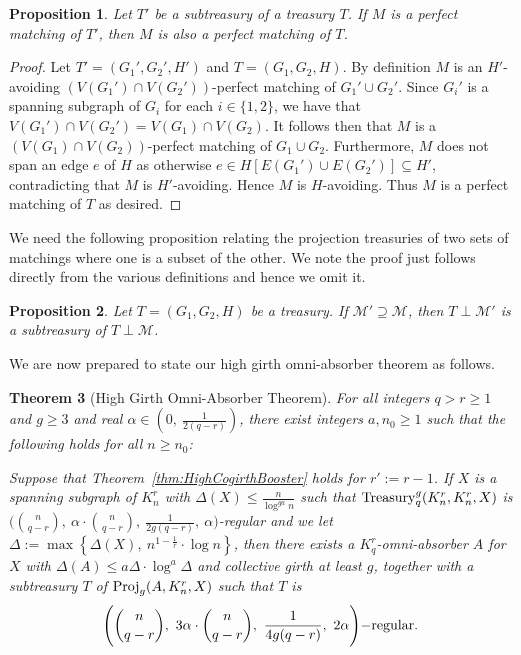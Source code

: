 \documentclass[11pt]{article}
\newcounter{i}
\theoremstyle{plain}
\newtheorem{thm}{Theorem}[section]
\newtheorem{proposition}[thm]{Proposition}
\theoremstyle{plain} %
\theoremstyle{definition}
\begin{document}
\begin{proposition}\label{prop:SubTreasury}
Let $T'$ be a subtreasury of a treasury $T$. If $M$ is a perfect matching of $T'$, then $M$ is also a perfect matching of $T$.    
\end{proposition}
\begin{proof}
Let $T'=(G_1',G_2',H')$ and $T=(G_1,G_2,H)$. By definition $M$ is an $H'$-avoiding $(V(G_1')\cap V(G_2'))$-perfect matching of $G_1'\cup G_2'$. Since $G_i'$ is a spanning subgraph of $G_i$ for each $i\in \{1,2\}$, we have that $V(G_1')\cap V(G_2') = V(G_1)\cap V(G_2)$.  It follows then that $M$ is a $(V(G_1)\cap V(G_2))$-perfect matching of $G_1\cup G_2$. Furthermore, $M$ does not span an edge $e$ of $H$ as otherwise $e\in H[E(G_1')\cup E(G_2')] \subseteq H'$, contradicting that $M$ is $H'$-avoiding. Hence $M$ is $H$-avoiding. Thus $M$ is a perfect matching of $T$ as desired.
\end{proof}

We need the following proposition relating the projection treasuries 
of two sets of matchings where one is a subset of the other. We note the proof just follows directly from the various definitions and hence we omit it.

\begin{proposition}\label{prop:SubProjTreasury}
Let $T=(G_1,G_2,H)$ be a treasury. If $\mathcal{M}'\supseteq \mathcal{M}$, then $T\perp \mathcal{M}'$ is a subtreasury of $T\perp \mathcal{M}$.
\end{proposition} 

We are now prepared to state our high girth omni-absorber theorem as follows.

\begin{thm}[High Girth Omni-Absorber Theorem]\label{thm:HighGirthAbsorber}
For all integers $q>r\ge 1$ and $g\ge 3$ and real $\alpha \in \left(0,~\frac{1}{2(q-r)}\right)$, there exist integers $a,n_0\ge 1$ such that the following holds for all $n\ge n_0$: 

Suppose that Theorem~\ref{thm:HighCogirthBooster} holds for $r':=r-1$. If $X$ is a spanning subgraph of $K_n^r$ with $\Delta(X) \le \frac{n}{\log^{ga} n}$ such that ${\rm Treasury}^g_q(K_n^r,K_n^r,X)$ is $\bigg(\binom{n}{q-r},~\alpha\cdot \binom{n}{q-r},~\frac{1}{2g(q-r)},~\alpha\bigg)$-regular and we let $\Delta:= \max\left\{ \Delta(X),~n^{1-\frac{1}{r}}\cdot \log n\right\}$, then there exists a $K_q^r$-omni-absorber $A$ for $X$ with $\Delta(A)\le a\Delta\cdot \log^{a} \Delta$ and collective girth at least $g$, together with a subtreasury $T$ of ${\rm Proj}_g(A, K_n^r, X)$ such that $T$ is 
$$\Bigg(\binom{n}{q-r},~3\alpha \cdot \binom{n}{q-r},~\frac{1}{4g(q-r)},~2\alpha\Bigg){\rm - regular}.$$
\end{thm}
\end{document}
